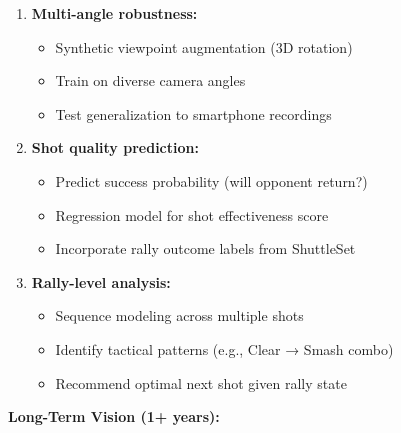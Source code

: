 \documentclass[11pt,a4paper]{article}
\begin{document}
\begin{enumerate}
\item \textbf{Multi-angle robustness:}
   \begin{itemize}
   \item Synthetic viewpoint augmentation (3D rotation)
   \item Train on diverse camera angles
   \item Test generalization to smartphone recordings
   \end{itemize}

\item \textbf{Shot quality prediction:}
   \begin{itemize}
   \item Predict success probability (will opponent return?)
   \item Regression model for shot effectiveness score
   \item Incorporate rally outcome labels from ShuttleSet
   \end{itemize}

\item \textbf{Rally-level analysis:}
   \begin{itemize}
   \item Sequence modeling across multiple shots
   \item Identify tactical patterns (e.g., Clear → Smash combo)
   \item Recommend optimal next shot given rally state
   \end{itemize}
\end{enumerate}

\textbf{Long-Term Vision (1+ years):}
\end{document}
